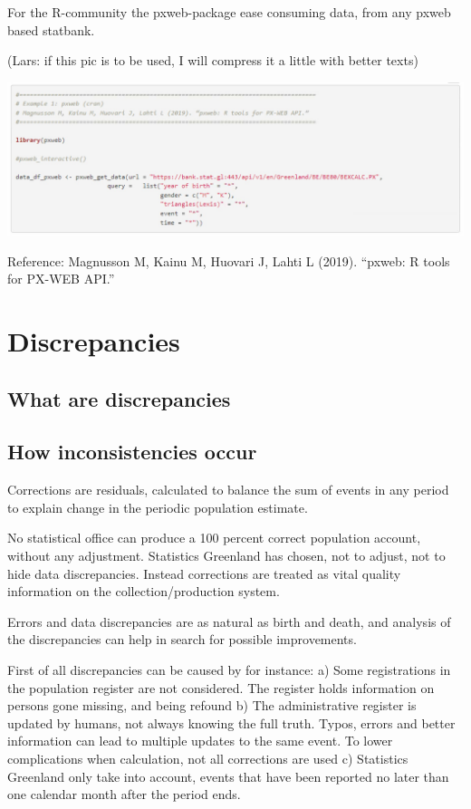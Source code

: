 \documentclass[USenglish]{article}
\begin{document}
For the R-community the pxweb-package ease consuming data, from any pxweb based statbank. 

(Lars: if this pic is to be used, I will compress it a little with better texts)

\includegraphics[scale=0.22]{images/pxwebR.png}


Reference: Magnusson M, Kainu M, Huovari J, Lahti L (2019). “pxweb: R tools for PX-WEB API.”


\section{Discrepancies}

\subsection{What are discrepancies}



\subsection{How inconsistencies occur}

Corrections are residuals, calculated to balance the sum of events in any period to explain change in the periodic population estimate.

No statistical office can produce a 100 percent correct population account, without any adjustment. Statistics Greenland has chosen, not to adjust, not to hide data discrepancies. Instead corrections are treated as vital quality information on the collection/production system.

Errors and data discrepancies are as natural as birth and death, and analysis of the discrepancies can help in search for possible improvements.

First of all discrepancies can be caused by for instance: a) Some registrations in the population register are not considered. The register holds information on persons gone missing, and being refound b) The administrative register is updated by humans, not always knowing the full truth. Typos, errors and better information can lead to multiple updates to the same event. To lower complications when calculation, not all corrections are used c) Statistics Greenland only take into account, events that have been reported no later than one calendar month after the period ends.
\end{document}
